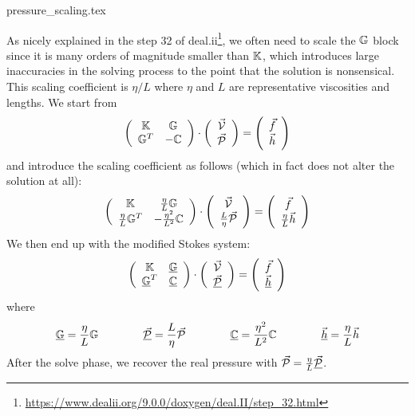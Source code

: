 \begin{flushright} {\tiny {\color{gray} pressure\_scaling.tex}} \end{flushright}

As nicely explained in the 
step 32 of deal.ii\footnote{\url{https://www.dealii.org/9.0.0/doxygen/deal.II/step\_32.html}},
we often need to scale the ${\mathbb{G}}$ block since it is many orders of magnitude smaller than ${\mathbb{K}}$, 
which introduces large inaccuracies in the solving process to the point that the solution is nonsensical. 
This scaling coefficient is $\eta/L$ where $\eta$ and $L$ are representative viscosities and lengths. 
We start from 
\[
\left(
\begin{array}{cc}
{\mathbb{K}} & {\mathbb{G}} \\ {\mathbb{G}}^T & -{\mathbb{C}} 
\end{array}
\right)
\cdot
\left(
\begin{array}{c}
\vec{\cal V} \\ \vec{\cal P}
\end{array}
\right)
=
\left(
\begin{array}{c}
\vec{f} \\ \vec{h}
\end{array}
\right)
\]
and introduce the scaling coefficient as follows (which in fact does not alter the solution at all):
\[
\left(
\begin{array}{cc}
{\mathbb{K}} & \frac{\eta}{L}{\mathbb{G}} \\ \frac{\eta}{L}{\mathbb{G}}^T & - \frac{\eta^2}{L^2} {\mathbb{C}} 
\end{array}
\right)
\cdot
\left(
\begin{array}{c}
\vec{\cal V} \\\frac{L}{\eta} \vec{\cal P}
\end{array}
\right)
=
\left(
\begin{array}{c}
 \vec{f} \\ \frac{\eta}{L} \vec{h}
\end{array}
\right)
\]
We then end up with the modified Stokes system:
\[
\left(
\begin{array}{cc}
{\mathbb{K}} & \underline{{\mathbb{G}}} \\ \underline{{\mathbb{G}}}^T & \underline{{\mathbb{C}}} 
\end{array}
\right)
\cdot
\left(
\begin{array}{c}
\vec{\cal V} \\ \underline{\vec{\cal P}}
\end{array}
\right)
=
\left(
\begin{array}{c}
\vec{f} \\ \underline{\vec{h}}
\end{array}
\right)
\]
where 
\[
\underline{{\mathbb{G}}}=\frac{\eta}{L}{\mathbb{G}}
\quad\quad
\quad\quad
\underline{\vec{\cal P}}=\frac{L}{\eta} \vec{\cal P}
\quad\quad
\quad\quad
\underline{{\mathbb{C}}}=\frac{\eta^2}{L^2} {\mathbb{C}}
\quad\quad
\quad\quad
\underline{\vec{h}}=\frac{\eta}{L}\vec{h}
\]
After the solve phase, we recover the real pressure with $\vec{\cal P}=\frac{\eta}{L}\underline{\vec{\cal P}}$.





